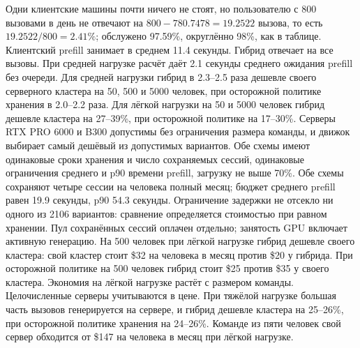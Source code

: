 Одни клиентские машины почти ничего не стоят, но пользователю с 800 вызовами в день
не отвечают на $800-780.7478=19.2522$ вызова, то есть $19.2522/800=2.41\%$;
обслужено 97.59\%, округлённо 98\%, как в таблице. Клиентский prefill занимает в среднем 11.4 секунды.
Гибрид отвечает на все вызовы. При средней нагрузке расчёт даёт 2.1 секунды среднего ожидания prefill
без очереди. Для средней нагрузки гибрид в 2.3--2.5 раза дешевле своего серверного кластера на 50, 500 и 5000 человек,
при осторожной политике хранения в 2.0--2.2 раза. Для лёгкой нагрузки на 50 и 5000 человек гибрид дешевле кластера на
27--39\%, при осторожной политике на 17--30\%. Серверы RTX PRO 6000 и B300 допустимы без ограничения размера команды,
и движок выбирает самый дешёвый из допустимых вариантов. Обе схемы имеют одинаковые сроки хранения и число сохраняемых сессий,
одинаковые ограничения среднего и p90 времени prefill, загрузку не выше 70\%.
Обе схемы сохраняют четыре сессии на человека полный месяц; бюджет среднего prefill равен 19.9 секунды, p90 54.3 секунды.
Ограничение задержки не отсекло ни одного из 2106 вариантов: сравнение определяется стоимостью при равном хранении.
Пул сохранённых сессий оплачен отдельно; занятость GPU включает активную генерацию.
На 500 человек при лёгкой нагрузке гибрид дешевле своего кластера: свой кластер стоит \$32 на человека в месяц против \$20 у гибрида.
При осторожной политике на 500 человек гибрид стоит \$25 против \$35 у своего кластера.
Экономия на лёгкой нагрузке растёт с размером команды. Целочисленные серверы учитываются в цене.
При тяжёлой нагрузке большая часть вызовов генерируется на сервере, и гибрид дешевле кластера на 25--26\%,
при осторожной политике хранения на 24--26\%. Команде из пяти человек свой сервер обходится
от \$147 на человека в месяц при лёгкой нагрузке.


